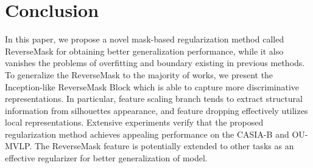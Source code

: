 \documentclass[runningheads]{llncs}
\begin{document}
\begin{table}[htbp]
\vspace*{-1.5em}
\caption{Performance of different regularization techniques. \textbf{RMB} donates ReverseMask Block for short. While Scaling DropBlock is a DropBlock-like regularization, Scaling DropBlock scales feature map rather than dropping. }
\vspace*{-1em}
\centering
\footnotesize
{}
\label{tab:augmentation}
\vspace*{-3em}
\end{table}









\section{Conclusion}
    In this paper, we propose a novel mask-based regularization method called ReverseMask for obtaining better generalization performance, while it also vanishes the problems of overfitting and boundary existing in previous methods. To generalize the ReverseMask to the majority of works, we present the Inception-like ReverseMask Block which is able to capture more discriminative representations. In particular, feature scaling branch tends to extract structural information from silhouettes appearance, and feature dropping effectively utilizes local representations. Extensive experiments verify that the proposed regularization method achieves appealing performance on the CASIA-B and OU-MVLP. The ReverseMask feature is potentially extended to other tasks as an effective regularizer for better generalization of model.
    




\clearpage
%
%


\end{document}

